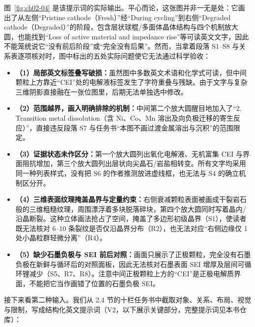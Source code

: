 图~\ref{fig:ch02-04} 是该提示词的实际输出。平心而论，这张图并非一无是处：它画出了从左侧“Pristine cathode（Fresh）”经“During cycling”到右侧“Degraded cathode（Degraded）”的阶段，包含层状球棍/多面体晶体结构与四个机制放大圆，也能找到“Loss of active material and impedance rise”等可读英文文字，因此不能笼统说它“没有前后阶段”或“完全没有后果”。然而，当拿着段落 S1–S8 与关系表逐项核对时，图中标出的五处实际问题使它无法通过科学验收：

\begin{itemize}
\item \textbf{（1）局部英文标签叠写破损：}虽然图中多数英文术语和化学式可读，但中间颗粒上方靠近“CEI”处的电解液标签发生了字符重叠与残缺。由于文字与复杂三维阴影直接融在一张位图里，后期无法单独选中修改。
\item \textbf{（2）范围越界，画入明确排除的机制：}中间第二个放大圆醒目地加入了“2. Transition metal dissolution（含 Ni、Co、Mn 溶出及向负极迁移的寄生反应）”，直接违反段落 S7 与任务书“本图不画过渡金属溶出与沉积”的范围限定。
\item \textbf{（3）证据状态未作区分：}第一个放大圆列出氧化电解液、无机富集 CEI 与界面阻抗增加，第三个放大圆列出层状向尖晶石/岩盐相转变。所有文字均采用同一种列表样式，没有把 S6 的作者推测放进虚线框，也无法与 S4 的确立机制区分开。
\item \textbf{（4）三维表面纹理掩盖晶界与定量约束：}右侧衰减颗粒表面被画成干裂岩石般的三维粗糙纹理，周围漂浮着多块脱落碎块，第四个放大圆同时写着晶内/沿晶断裂。这种立体画法抢占了空间，掩盖了多边形初级晶界（S1），使读者既无法核对 6–10 条裂纹是否仅沿晶界分布（R2），也无法对应“右侧边缘仅 1 处小晶粒群轻微分离”（R4）。
\item \textbf{（5）缺少石墨负极与 SEI 前后对照：}画面只展示了正极颗粒，完全没有石墨负极在新鲜与循环后的对照面板，因此无法核对石墨表面 SEI 增厚及层间可循环锂减少（S5、R7、R8）。注意中间正极颗粒上方的“CEI”是正极电解质界面，不能把它当作画错了位置的石墨负极 SEI。
\end{itemize}

接下来看第二种输入。我们从 2.4 节的十栏任务书中截取对象、关系、布局、视觉与限制，写成结构化英文提示词（V2，以下展示关键部分，完整提示词见本书仓库）：

